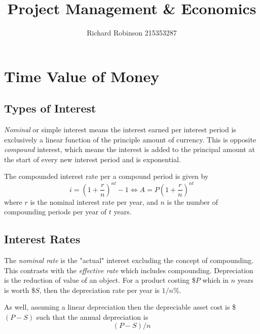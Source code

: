 \documentclass[oneside, 11pt]{book}
\title{\Huge{\textbf{Project Management \& Economics}}}
\author{Richard Robinson 215353287}
\begin{document}
\maketitle
\tableofcontents
\setlength{\parindent}{0pt}

\chapter{Time Value of Money}

\section{Types of Interest}

\emph{Nominal} or simple interest means the interest earned per interest period is exclusively a linear function of the principle amount of currency. This is opposite \emph{compound} interest, which means the interest is added to the principal amount at the start of every new interest period and is exponential.

\bigskip
The compounded interest rate per a compound period is given by \begin{equation}
    i = \left(1 + \frac{r}{n} \right)^{nt} - 1 \iff A = P \left(1 + \frac{r}{n} \right)^{nt}
\end{equation}
where $r$ is the nominal interest rate per year, and $n$ is the number of compounding periods per year of $t$ years.

\section{Interest Rates}
The \emph{nominal rate} is the "actual" interest excluding the concept of compounding. This contrasts with the \emph{effective rate} which includes compounding. Depreciation is the reduction of value of an object. For a product costing \$$P$ which in $n$ years is worth \$$S$, then the depreciation rate per year is $1/n$\%.

\bigskip
As well, assuming a linear depreciation then the depreciable asset cost is \$$(P-S)$ such that the annual depreciation is \begin{equation}
    (P-S)/n
\end{equation}
\end{document}
